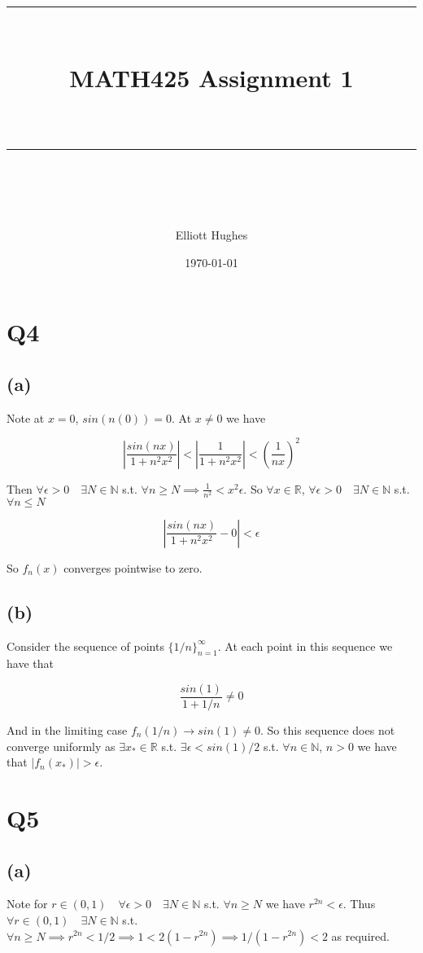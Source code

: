 \documentclass{article}
\title{	
	\normalfont\normalsize 
	\rule{\linewidth}{0.5pt}\\ %
	\vspace{14pt} %
	{\LARGE MATH425 Assignment 1\\ %
    \large \textit{} \\}
	\vspace{6pt} %
	\rule{\linewidth}{1pt}\\ %
}
\author{Elliott Hughes}
\date{\normalsize\today}
\begin{document}
\maketitle

\section*{Q4}
\subsection*{(a)}
Note at $x=0$, $sin(n(0)) = 0$. At $x\neq 0$ we have 

\begin{equation}
	\left|\frac{sin(nx)}{1+n^2x^2}\right| < \left|\frac{1}{1+n^2x^2}\right| < \left(\frac{1}{nx}\right)^2
\end{equation}

Then $\forall \epsilon > 0 \quad\exists N \in \mathbb{N}$ s.t. $\forall n \geq N \implies \frac{1}{n^2} < x^2\epsilon$.
So $\forall x \in \mathbb{R}$, $\forall \epsilon > 0 \quad\exists N \in \mathbb{N}$ s.t. $\forall n \leq N$

\begin{equation*}
	\left|\frac{sin(nx)}{1+n^2x^2} - 0 \right| < \epsilon
\end{equation*}

So $f_n(x)$ converges pointwise to zero.

\subsection*{(b)}
Consider the sequence of points $\{1/n\}_{n=1}^\infty$. At each point in this sequence we have that 

\begin{equation*}
	\frac{sin(1)}{1 + 1/n} \neq 0
\end{equation*}

And in the limiting case $f_n(1/n) \rightarrow sin(1) \neq 0$. So this sequence does not converge 
uniformly as $\exists x_* \in \mathbb{R}$ s.t. $\exists \epsilon < sin(1)/2$ s.t. $\forall n \in \mathbb{N}$, $n >0$ 
we have that $|f_n(x_*)| > \epsilon$.

\section*{Q5}
\subsection*{(a)}
Note for $r \in (0,1) \quad \forall \epsilon > 0 \quad \exists N \in \mathbb{N}$ s.t. $\forall n \geq N$ we 
have $r^{2n} < \epsilon$. Thus $\forall r \in (0,1) \quad \exists N \in \mathbb{N}$ s.t. $\forall n \geq N \implies 
r^{2n} < 1/2 \implies 1 < 2(1-r^{2n}) \implies 1/(1-r^{2n}) < 2$ as required.
\end{document}
